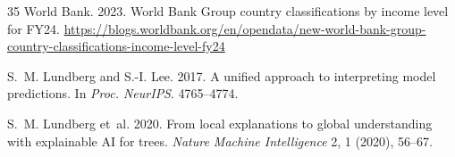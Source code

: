 \documentclass[sigconf]{acmart}
\begin{document}
\begin{thebibliography}{35}
World Bank. 2023. World Bank Group country classifications by income level for FY24. \url{https://blogs.worldbank.org/en/opendata/new-world-bank-group-country-classifications-income-level-fy24}

S.~M. Lundberg and S.-I. Lee. 2017. A unified approach to interpreting model predictions. In \emph{Proc. NeurIPS}. 4765--4774.

S.~M. Lundberg et~al. 2020. From local explanations to global understanding with explainable AI for trees. \emph{Nature Machine Intelligence} 2, 1 (2020), 56--67.

\end{thebibliography}
\endgroup
\end{document}
